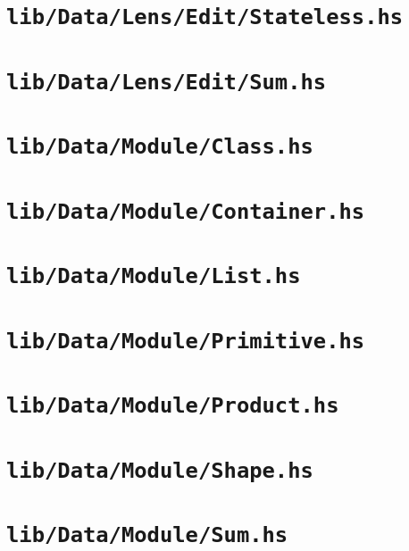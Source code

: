 \section{\texttt{lib/Data/Lens/Edit/Stateless.hs}}
\label{mod:Data.Lens.Edit.Stateless}


\section{\texttt{lib/Data/Lens/Edit/Sum.hs}}
\label{mod:Data.Lens.Edit.Sum}


\section{\texttt{lib/Data/Module/Class.hs}}
\label{mod:Data.Module.Class}


\section{\texttt{lib/Data/Module/Container.hs}}
\label{mod:Data.Module.Container}


\section{\texttt{lib/Data/Module/List.hs}}
\label{mod:Data.Module.List}


\section{\texttt{lib/Data/Module/Primitive.hs}}
\label{mod:Data.Module.Primitive}


\section{\texttt{lib/Data/Module/Product.hs}}
\label{mod:Data.Module.Product}


\section{\texttt{lib/Data/Module/Shape.hs}}
\label{mod:Data.Module.Shape}


\section{\texttt{lib/Data/Module/Sum.hs}}
\label{mod:Data.Module.Sum}


